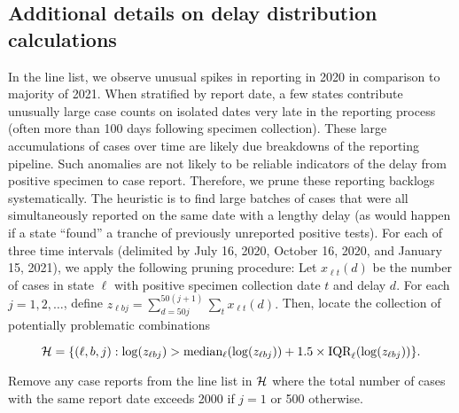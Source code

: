 \subsection{Additional details on delay distribution calculations}
\label{supp:delay-justifications}
\begin{linenomath*}
In the line list, we observe unusual spikes in reporting in 2020 in comparison
to majority of 2021. When stratified by report date, a few states contribute
unusually large case counts on isolated dates very late in the reporting process
(often more than 100 days following specimen collection). These large
accumulations of cases over time are likely due breakdowns of the reporting
pipeline. Such anomalies are not likely to be reliable indicators of the delay
from positive specimen to case report. Therefore, we prune these reporting
backlogs systematically. The heuristic is to find large batches of cases that
were all simultaneously reported on the same date with a lengthy delay (as would
happen if a state ``found'' a tranche of previously unreported positive tests).
For each of three time intervals (delimited by July 16, 2020, 
October 16, 2020, and January 15, 2021), we apply the following pruning procedure:
Let $x_{\ell t}(d)$ be the number of cases in state $\ell$ with positive
specimen collection date $t$ and delay $d$. For each $j=1,2,\ldots$, 
define 
$
z_{\ell bj} = \sum_{d = 50j}^{50(j+1)}\sum_t x_{\ell
t}(d).$ Then, locate the collection of
potentially problematic combinations 
\end{linenomath*}
\begin{linenomath*}
$$
\mathcal{H} = \{(\ell, b, j) : \log(z_{\ell bj}) >
\textrm{median}_{\ell}(\log(z_{\ell bj})) + 1.5
\times\textrm{IQR}_\ell(\log(z_{\ell bj}))\}.
$$
\end{linenomath*}
Remove any case reports from the line list in $\mathcal{H}$ where the total number of
cases with the same report date exceeds 2000 if $j=1$ or 500 otherwise.


